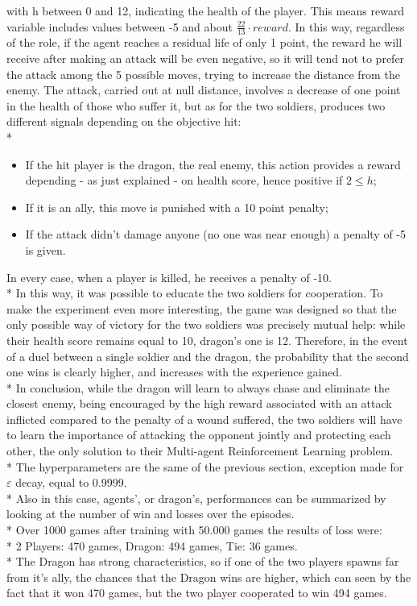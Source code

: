 with h between 0 and 12, indicating the health of the player. This means reward variable includes values between -5 and about $\frac{22}{13}\cdot reward$. In this way, regardless of the role, if the agent reaches a residual life of only 1 point, the reward he will receive after making an attack will be even negative, so it will tend not to prefer the attack among the 5 possible moves, trying to increase the distance from the enemy. The attack, carried out at null distance, involves a decrease of one point in the health of those who suffer it, but as for the two soldiers, produces two different signals depending on the objective hit:\\*
\begin{itemize}[noitemsep, topsep=0ex]
  \item If the hit player is the dragon, the real enemy, this action provides a reward depending - as just explained - on health score, hence positive if $2\leq h$;
  \item If it is an ally, this move is punished with a 10 point penalty;
  \item If the attack didn't damage anyone (no one was near enough) a penalty of -5 is given.
\end{itemize}
In every case, when a player is killed, he receives a penalty of -10.\\*
In this way, it was possible to educate the two soldiers for cooperation. To make the experiment even more interesting, the game was designed so that the only possible way of victory for the two soldiers was precisely mutual help: while their health score remains equal to 10, dragon's one is 12. Therefore, in the event of a duel between a single soldier and the dragon, the probability that the second one wins is clearly higher, and increases with the experience gained.\\*
In conclusion, while the dragon will learn to always chase and eliminate the closest enemy, being encouraged by the high reward associated with an attack inflicted compared to the penalty of a wound suffered, the two soldiers will have to learn the importance of attacking the opponent jointly and protecting each other, the only solution to their Multi-agent Reinforcement Learning problem.\\*
The hyperparameters are the same of the previous section, exception made for $\varepsilon$ decay, equal to 0.9999.\\*
Also in this case, agents', or dragon's, performances can be summarized by looking at the number of win and losses over the episodes.\\*
Over 1000 games after training with 50.000 games the results of loss were:\\*
2 Players: 470 games, Dragon: 494 games, Tie: 36 games.\\*
The Dragon has strong characteristics, so if one of the two players spawns far from it's ally, the chances that the Dragon wins are higher, which can seen by the fact that it won 470 games, but the two player cooperated to win 494 games.

